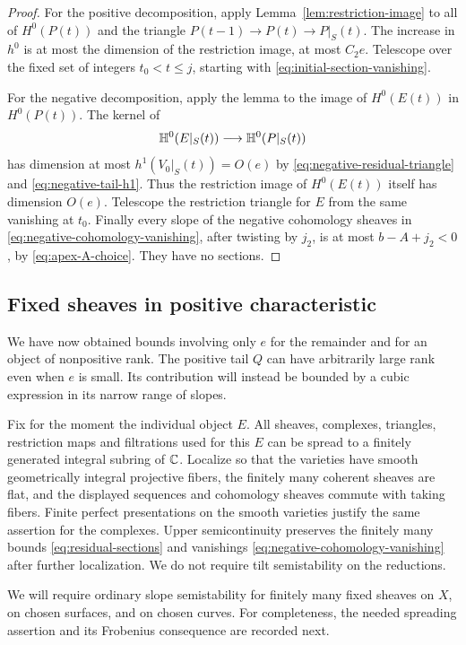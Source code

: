 \begin{proof}
For the positive decomposition, apply
Lemma~\ref{lem:restriction-image} to all of $H^0(P(t))$ and the
triangle $P(t-1)\to P(t)\to P|_S(t)$.
The increase in $h^0$ is at most the dimension of the restriction image,
at most $C_2e$.  Telescope over the fixed set of integers
$t_0<t\leq j$, starting with
\eqref{eq:initial-section-vanishing}.

For the negative decomposition, apply the lemma to the image of
$H^0(E(t))$ in $H^0(P(t))$.  The kernel of
\[
 \mathbb H^0(E|_S(t))\longrightarrow\mathbb H^0(P|_S(t))
\]
has dimension at most $h^1(V_0|_S(t))=O(e)$ by
\eqref{eq:negative-residual-triangle} and
\eqref{eq:negative-tail-h1}.  Thus the restriction image of
$H^0(E(t))$ itself has dimension $O(e)$.  Telescope the restriction
triangle for $E$ from the same vanishing at $t_0$.
Finally every slope of the negative cohomology sheaves in
\eqref{eq:negative-cohomology-vanishing}, after twisting by $j_2$,
is at most $b-A+j_2<0$, by \eqref{eq:apex-A-choice}.
They have no sections.
\end{proof}

\subsection{Fixed sheaves in positive characteristic}

We have now obtained bounds involving only $e$ for the remainder
and for an object of nonpositive rank.  The positive tail $Q$ can
have arbitrarily large rank even when $e$ is small.  Its contribution
will instead be bounded by a cubic expression in its narrow range
of slopes.

Fix for the moment the individual object $E$.  All sheaves,
complexes, triangles, restriction maps and filtrations used for
this $E$ can be spread to a finitely generated integral subring
of $\mathbb C$.  Localize so that the varieties have smooth geometrically
integral projective fibers, the finitely many coherent sheaves are
flat, and the displayed sequences and cohomology sheaves commute
with taking fibers.  Finite perfect presentations on the smooth
varieties justify the same assertion for the complexes.
Upper semicontinuity preserves the finitely many bounds
\eqref{eq:residual-sections} and vanishings
\eqref{eq:negative-cohomology-vanishing} after further localization.
We do not require tilt semistability on the reductions.

We will require ordinary slope semistability for finitely many
fixed sheaves on $X$, on chosen surfaces, and on chosen curves.
For completeness, the needed spreading assertion and its
Frobenius consequence are recorded next.

